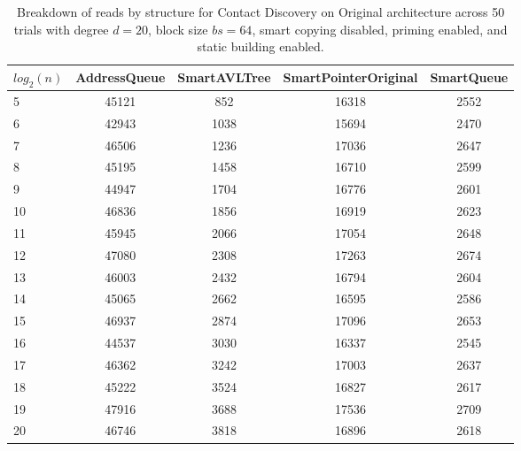 \begin{table}[]
\centering
\begin{tabular}{|l|c|c|c|c|}
$log_2(n)$ & AddressQueue & SmartAVLTree & SmartPointerOriginal & SmartQueue \\ \hline
5 & 45121 & 852 & 16318 & 2552 \\ \hline
6 & 42943 & 1038 & 15694 & 2470 \\ \hline
7 & 46506 & 1236 & 17036 & 2647 \\ \hline
8 & 45195 & 1458 & 16710 & 2599 \\ \hline
9 & 44947 & 1704 & 16776 & 2601 \\ \hline
10 & 46836 & 1856 & 16919 & 2623 \\ \hline
11 & 45945 & 2066 & 17054 & 2648 \\ \hline
12 & 47080 & 2308 & 17263 & 2674 \\ \hline
13 & 46003 & 2432 & 16794 & 2604 \\ \hline
14 & 45065 & 2662 & 16595 & 2586 \\ \hline
15 & 46937 & 2874 & 17096 & 2653 \\ \hline
16 & 44537 & 3030 & 16337 & 2545 \\ \hline
17 & 46362 & 3242 & 17003 & 2637 \\ \hline
18 & 45222 & 3524 & 16827 & 2617 \\ \hline
19 & 47916 & 3688 & 17536 & 2709 \\ \hline
20 & 46746 & 3818 & 16896 & 2618 \\ \hline
\end{tabular}
\caption{Breakdown of reads by structure for Contact Discovery on Original architecture across 50 trials with degree $d=20$, block size $bs=64$, smart copying disabled, priming enabled, and static building enabled.}
    \label{tab:reads_by_structure_cd_d20_bs64_trials50_copiesfalse_primetrue_staticinsertiontrue_ptoriginal_movefalse}
\end{table}

